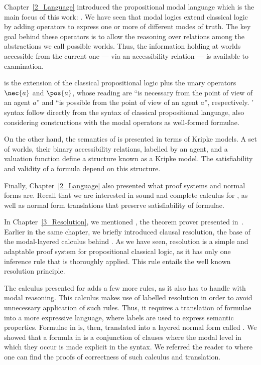 Chapter~\ref{2_Language} introduced the propositional modal language which is
the main focus of this work: . We have seen that modal logics
extend classical logic by adding operators to express one or more of different
modes of truth.  The key goal behind these operators is to allow the reasoning
over relations among the abstractions we call possible worlds. Thus, the
information holding at worlds accessible from the current one --- via an
accessibility relation --- is available to examination.  

 is the extension of the classical propositional logic plus the
unary operators $\nec{a}$ and $\pos{a}$, whose reading are ``is necessary from
the point of view of an agent $a$'' and ``is possible from the point of view of
an agent $a$'', respectively. ' syntax follow directly from the
syntax of classical propositional language, also considering constructions with
the modal operators as well-formed formulae.

On the other hand, the semantics of  is presented in terms of
Kripke models. A set of worlds, their binary accessibility relations, labelled
by an agent, and a valuation function define a structure known as a Kripke
model. The satisfiability and validity of a formula depend on this
structure.

Finally, Chapter~\ref{2_Language} also presented what proof systems and normal
forms are. Recall that we are interested in sound and complete calculus for
, as well as normal form translations that preserve
satisfiability of formulae.

In Chapter~\ref{3_Resolution}, we mentioned \ksp, the theorem prover presented
in~\cite{Nalon2016}. Earlier in the same chapter, we briefly introduced clausal
resolution, the base of the modal-layered calculus behind \ksp. As we have seen,
resolution is a simple and adaptable proof system for propositional classical
logic, as it has only one inference rule that is thoroughly applied. This rule
entails the well known resolution principle.

The calculus presented for  adds a few more rules, as it also has
to handle with modal reasoning. This calculus makes use of labelled resolution
in order to avoid unnecessary application of such rules. Thus, it requires a
translation of formulae into a more expressive language, where labels are used
to express semantic properties. Formulae in  is, then, translated
into a layered normal form called . We showed that a formula in
 is a conjunction of clauses where the modal level in which they occur
is made explicit in the syntax. We referred the reader to where one can find the
proofs of correctness of such calculus and translation.

